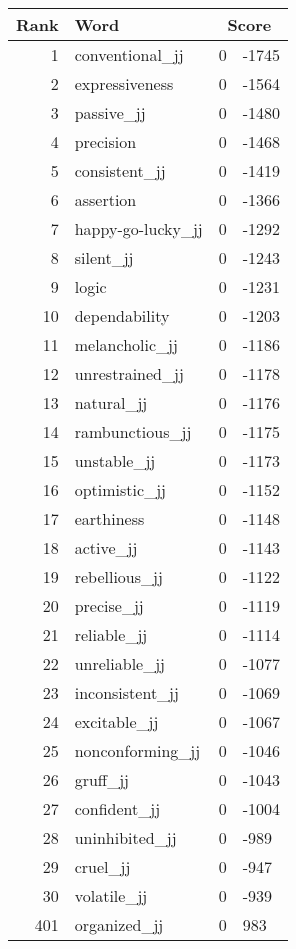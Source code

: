 \begin{longtable}[!htbp]{| rlr@{.}l |}
    \hline
    \textbf{Rank} & \textbf{Word} & \multicolumn{2}{c|}{\textbf{Score}} \\
    \hline
    \endhead
    1 & conventional\_jj & 0 & -1745 \\
    2 & expressiveness & 0 & -1564 \\
    3 & passive\_jj & 0 & -1480 \\
    4 & precision & 0 & -1468 \\
    5 & consistent\_jj & 0 & -1419 \\
    6 & assertion & 0 & -1366 \\
    7 & happy-go-lucky\_jj & 0 & -1292 \\
    8 & silent\_jj & 0 & -1243 \\
    9 & logic & 0 & -1231 \\
    10 & dependability & 0 & -1203 \\
    11 & melancholic\_jj & 0 & -1186 \\
    12 & unrestrained\_jj & 0 & -1178 \\
    13 & natural\_jj & 0 & -1176 \\
    14 & rambunctious\_jj & 0 & -1175 \\
    15 & unstable\_jj & 0 & -1173 \\
    16 & optimistic\_jj & 0 & -1152 \\
    17 & earthiness & 0 & -1148 \\
    18 & active\_jj & 0 & -1143 \\
    19 & rebellious\_jj & 0 & -1122 \\
    20 & precise\_jj & 0 & -1119 \\
    21 & reliable\_jj & 0 & -1114 \\
    22 & unreliable\_jj & 0 & -1077 \\
    23 & inconsistent\_jj & 0 & -1069 \\
    24 & excitable\_jj & 0 & -1067 \\
    25 & nonconforming\_jj & 0 & -1046 \\
    26 & gruff\_jj & 0 & -1043 \\
    27 & confident\_jj & 0 & -1004 \\
    28 & uninhibited\_jj & 0 & -989 \\
    29 & cruel\_jj & 0 & -947 \\
    30 & volatile\_jj & 0 & -939 \\
    401 & organized\_jj & 0 & 983 \\

\end{longtable}
